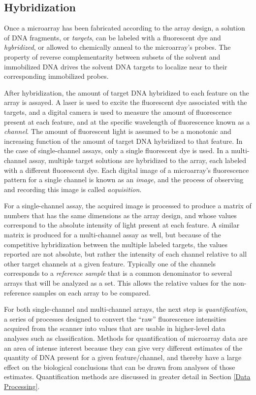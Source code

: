 \subsection{Hybridization}\label{Hybridization}

Once a microarray has been fabricated according to the array design, a solution
of DNA fragments, or \emph{targets}, can be labeled with a fluorescent dye and
\emph{hybridized}, or allowed to chemically anneal to the microarray's probes.
The property of reverse complementarity between subsets of the solvent and
immobilized DNA drives the solvent DNA targets to localize near to their
corresponding immobilized probes.

After hybridization, the amount of target DNA hybridized to each feature on the
array is assayed.  A laser is used to excite the fluorescent dye associated
with the targets, and a digital camera is used to measure the amount of
fluorescence present at each feature, and at the specific wavelength of
fluorescence known as a \emph{channel}.  The amount of fluorescent light is
assumed to be a monotonic and increasing function of the amount of target DNA
hybridized to that feature.  In the case of single-channel assays, only a
single fluorescent dye is used.  In a multi-channel assay, multiple target
solutions are hybridized to the array, each labeled with a different
fluorescent dye.  Each digital image of a microarray's fluorescence pattern for
a single channel is known as an \emph{image}, and the process of observing and
recording this image is called \emph{acquisition}.

For a single-channel assay, the acquired image is processed to produce a matrix
of numbers that has the same dimensions as the array design, and whose values
correspond to the absolute intensity of light present at each feature.  A
similar matrix is produced for a multi-channel assay as well, but because of
the competitive hybridization between the multiple labeled targets, the values
reported are not absolute, but rather the intensity of each channel relative to
all other target channels at a given feature.  Typically one of the channels
corresponds to a \emph{reference sample} that is a common denominator to
several arrays that will be analyzed as a set.  This allows the relative values
for the non-reference samples on each array to be compared.

For both single-channel and multi-channel arrays, the next step is
\emph{quantification}, a series of processes designed to convert the ``raw''
fluorescence intensities acquired from the scanner into values that are usable
in higher-level data analyses such as classification.  Methods for
quantification of microarray data are an area of intense interest
\cite{mas5,affy4,mbei,rma,vsn,gcrma,affyplm,seo,affybench} because they can
give very different estimates of the quantity of DNA present for a given
feature/channel, and thereby have a large effect on the biological conclusions
that can be drawn from analyses of those estimates.  Quantification methods are
discussed in greater detail in Section \ref{Data Processing}.
